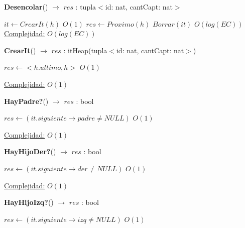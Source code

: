 \begin{Algoritmos}
\begin{algorithm}[H]{\textbf{Desencolar}() $\to$ $res$ : tupla$<$id: nat, cantCapt: nat$>$}
    	\begin{algorithmic}[1]
    		 \State $it \gets CrearIt(h)$ \Comment $O(1)$
		     \State $res \gets Proximo(h)$    		 
    		 \State $Borrar(it)$ \Comment $O(log(EC))$
    		 \medskip
			\Statex \underline{Complejidad:} $O(log(EC))$
    	\end{algorithmic}
\end{algorithm}

\end{Algoritmos}

\begin{Algoritmos}


\begin{algorithm}[H]{\textbf{CrearIt}() $\to$ $res$ : itHeap(tupla$<$id: nat, cantCapt: nat$>$)}
    	\begin{algorithmic}[1]
			 \State $res \gets  <h.ultimo, h> $ \Comment $O(1)$

			\medskip
			\Statex \underline{Complejidad:} $O(1)$
    	\end{algorithmic}
\end{algorithm}

\begin{algorithm}[H]{\textbf{HayPadre?}() $\to$ $res$ : bool}
    	\begin{algorithmic}[1]
			 \State $res \gets  (it.siguiente \rightarrow padre \not= NULL) $ \Comment $O(1)$

			\medskip
			\Statex \underline{Complejidad:} $O(1)$
    	\end{algorithmic}
\end{algorithm}

\begin{algorithm}[H]{\textbf{HayHijoDer?}() $\to$ $res$ : bool}
    	\begin{algorithmic}[1]
			 \State $res \gets  (it.siguiente \rightarrow der \not= NULL) $ \Comment $O(1)$

			\medskip
			\Statex \underline{Complejidad:} $O(1)$
    	\end{algorithmic}
\end{algorithm}

\begin{algorithm}[H]{\textbf{HayHijoIzq?}() $\to$ $res$ : bool}
    	\begin{algorithmic}[1]
			 \State $res \gets  (it.siguiente \rightarrow izq \not= NULL) $ \Comment $O(1)$


\end{algorithmic}
\end{algorithm}
\end{Algoritmos}
